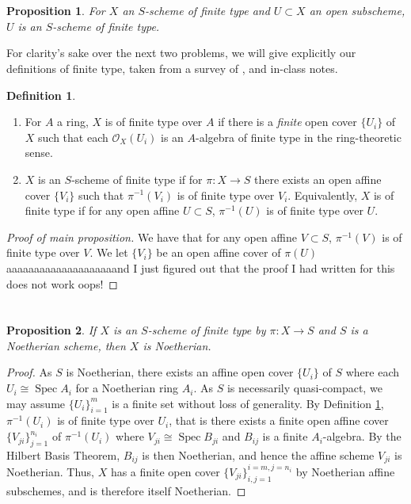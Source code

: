 \documentclass[english,letter,doublesided]{article}
\DeclareMathOperator{\spec}{Spec}
\newcommand{\OO}{\mathcal{O}}
\newcommand{\prob}[1]{\setcounter{section}{#1-1}\section{}}
\newtheorem*{prop*}{Proposition}
\theoremstyle{remark}
\theoremstyle{definition}
\newtheorem{defn}[thm]{Definition}
\begin{document}
\prob{2}
\begin{prop*}
For $X$ an $S$-scheme of finite type and $U\subset X$ an open subscheme, $U$ is an $S$-scheme of finite type.
\end{prop*}
For clarity's sake over the next two problems, we will give explicitly our definitions of finite type, taken from a survey of \cite[pp.84]{hsh}, \cite[pp.159]{FOAG} and in-class notes.
\begin{defn}~\label{defn:ft}
\begin{enumerate}[label=\textit{(\roman*)}]

	\item For $A$ a ring, $X$ is of finite type over $A$ if there is a \textit{finite} open cover $\{U_i\}$ of $X$ such that each $\OO_X(U_i)$ is an $A$-algebra of finite type in the ring-theoretic sense.
	\item $X$ is an $S$-scheme of finite type if for $\pi:X\to S$ there exists an open affine cover $\{V_i\}$ such that $\pi^{-1}(V_i)$ is of finite type over $V_i$. Equivalently, $X$ is of finite type if for any open affine $U\subset S$, $\pi^{-1}(U)$ is of finite type over $U$.
\end{enumerate}
\end{defn}
\begin{proof}[Proof of main proposition]
	We have that for any open affine $V\subset S$, $\pi^{-1}(V)$ is of finite type over $V$. We let $\{V_i\}$ be an open affine cover of $\pi(U)$ aaaaaaaaaaaaaaaaaaaand I just figured out that the proof I had written for this does not work oops!
\end{proof}


\prob{3}
\begin{prop*}
	If $X$ is an $S$-scheme of finite type by $\pi:X\to S$ and $S$ is a Noetherian scheme, then $X$ is Noetherian.
\end{prop*}
\begin{proof}
	As $S$ is Noetherian, there exists an affine open cover $\{U_i\}$ of $S$ where each $U_i\cong \spec A_i$ for a Noetherian ring $A_i$. As $S$ is necessarily quasi-compact, we may assume $\{U_i\}_{i=1}^m$ is a finite set without loss of generality. By Definition \ref{defn:ft}, $\pi^{-1}(U_i)$ is of finite type over $U_i$, that is there exists a finite open affine cover $\{V_{ji}\}_{j=1}^{n_i}$ of $\pi^{-1}(U_i)$ where $V_{ji}\cong\spec B_{ji}$ and $B_{ij}$ is a finite $A_i$-algebra. By the Hilbert Basis Theorem, $B_{ij}$ is then Noetherian, and hence the affine scheme $V_{ji}$ is Noetherian. Thus, $X$ has a finite open cover $\{V_{ji}\}_{i,j=1}^{i=m,j=n_i}$ by Noetherian affine subschemes, and is therefore itself Noetherian.	
\end{proof}
\end{document}
